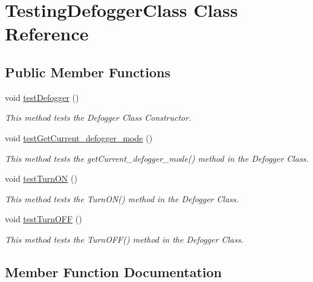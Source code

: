 \hypertarget{class_testing_defogger_class}{}\section{Testing\+Defogger\+Class Class Reference}
\label{class_testing_defogger_class}
\subsection*{Public Member Functions}
\begin{DoxyCompactItemize}
\item 
void \hyperlink{class_testing_defogger_class_afebb8bc7ab58f67cd72961c3b92ca602}{test\+Defogger} ()
\begin{DoxyCompactList}\small\item\em This method tests the Defogger Class Constructor. \end{DoxyCompactList}\item 
void \hyperlink{class_testing_defogger_class_ae063f54719922406254c4a0e41aadea0}{test\+Get\+Current\+\_\+defogger\+\_\+mode} ()
\begin{DoxyCompactList}\small\item\em This method tests the get\+Current\+\_\+defogger\+\_\+mode() method in the Defogger Class. \end{DoxyCompactList}\item 
void \hyperlink{class_testing_defogger_class_a1a4999d91579f7da54423320827a7aee}{test\+Turn\+O\+N} ()
\begin{DoxyCompactList}\small\item\em This method tests the Turn\+O\+N() method in the Defogger Class. \end{DoxyCompactList}\item 
void \hyperlink{class_testing_defogger_class_a698b7d649f89c5f44efefa2a7bb3b93e}{test\+Turn\+O\+F\+F} ()
\begin{DoxyCompactList}\small\item\em This method tests the Turn\+O\+F\+F() method in the Defogger Class. \end{DoxyCompactList}\end{DoxyCompactItemize}


\subsection{Member Function Documentation}
\hypertarget{class_testing_defogger_class_afebb8bc7ab58f67cd72961c3b92ca602}{}
